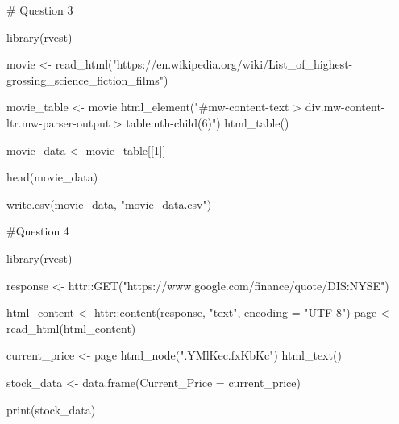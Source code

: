 # Question 3

library(rvest)

movie <- read_html("https://en.wikipedia.org/wiki/List_of_highest-grossing_science_fiction_films")

movie_table <- movie %
  html_element("#mw-content-text > div.mw-content-ltr.mw-parser-output > table:nth-child(6)") %
  html_table()


movie_data <- movie_table[[1]]

head(movie_data)

write.csv(movie_data, "movie_data.csv")



#Question 4

library(rvest)

response <- httr::GET("https://www.google.com/finance/quote/DIS:NYSE")

html_content <- httr::content(response, "text", encoding = "UTF-8")
page <- read_html(html_content)


current_price <- page %
  html_node(".YMlKec.fxKbKc") %
  html_text()

stock_data <- data.frame(Current_Price = current_price)

print(stock_data)
